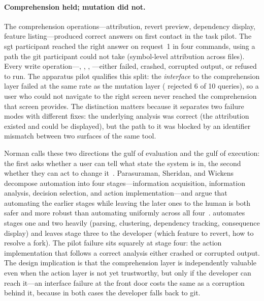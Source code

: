 \paragraph{Comprehension held; mutation did not.}
The comprehension operations---attribution, revert preview, dependency
display, feature listing---produced correct answers on first contact in the task
pilot. The sgt participant reached the right answer on request~1
in four commands, using a path the git participant could not take (symbol-level
attribution across files). Every write operation---,
, , ---either failed, crashed, corrupted
output, or refused to run. The apparatus pilot qualifies this split: the
\emph{interface} to the comprehension layer failed at the same rate as the
mutation layer ( rejected 6 of 10 queries), so a user who could not
navigate to the right screen never reached the comprehension that screen
provides. The distinction matters because it separates two failure modes with
different fixes: the underlying analysis was correct (the attribution existed and
could be displayed), but the path to it was blocked by an identifier mismatch
between two surfaces of the same tool.

Norman calls these two directions the gulf of
evaluation and the gulf of execution: the first asks whether a user can tell
what state the system is in, the second whether they can act to change
it~\cite{norman1986}. Parasuraman, Sheridan, and Wickens decompose automation
into four stages---information acquisition, information analysis, decision
selection, and action implementation---and argue that automating the earlier
stages while leaving the later ones to the human is both safer and more robust
than automating uniformly across all four~\cite{parasuraman2000}. \sgt{}
automates stages one and two heavily (parsing, clustering, dependency tracking,
consequence display) and leaves stage three to the developer (which feature to
revert, how to resolve a fork). The pilot failure sits squarely at stage four:
the action implementation that follows a correct analysis either crashed or
corrupted output. The design implication is that the comprehension layer is
independently valuable even when the action layer is not yet trustworthy, but
only if the developer can reach it---an interface failure at the front door costs
the same as a corruption behind it, because in both cases the developer falls
back to git.

